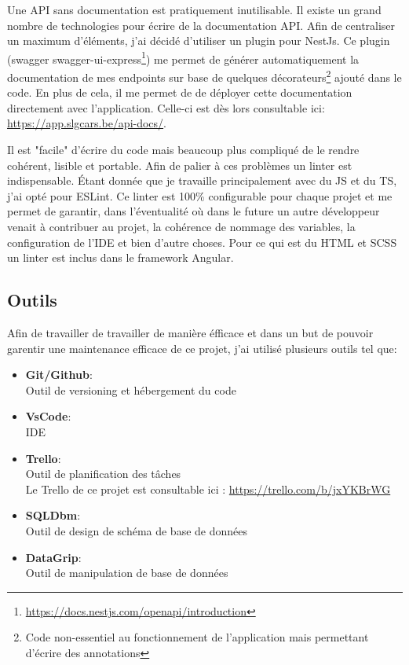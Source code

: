\newpara

Une API sans documentation est pratiquement inutilisable. Il existe un grand nombre de technologies pour écrire de la documentation API. Afin de centraliser un maximum d'éléments, j'ai décidé d'utiliser un plugin pour NestJs. Ce plugin (swagger swagger-ui-express\footnote{\url{https://docs.nestjs.com/openapi/introduction}}) me permet de générer automatiquement la documentation de mes endpoints sur base de quelques décorateurs\footnote{Code non-essentiel au fonctionnement de l'application mais permettant d'écrire des annotations} ajouté dans le code. En plus de cela, il me permet de de déployer cette documentation directement avec l'application. Celle-ci est dès lors consultable ici:\\\url{https://app.slgcars.be/api-docs/}.

\newpage


Il est "facile" d'écrire du code mais beaucoup plus compliqué de le rendre cohérent, lisible et portable. Afin de palier à ces problèmes un linter est indispensable. Étant donnée que je travaille principalement avec du JS et du TS, j'ai opté pour ESLint. Ce linter est 100\% configurable pour chaque projet et me permet de garantir, dans l'éventualité où dans le future un autre développeur venait à contribuer au projet, la cohérence de nommage des variables, la configuration de l'IDE et bien d'autre choses. Pour ce qui est du HTML et SCSS un linter est inclus dans le framework Angular.

\subsection{Outils}

Afin de travailler de travailler de manière éfficace et dans un but de pouvoir garentir une maintenance efficace de ce projet, j'ai utilisé plusieurs outils tel que:

\newpara

\begin{itemize}
  \item \textbf{Git/Github}: \\ Outil de versioning et hébergement du code 
  \item \textbf{VsCode}: \\ IDE 
  \item \textbf{Trello}: \\ Outil de planification des tâches \\ Le Trello de ce projet est consultable ici : \url{https://trello.com/b/jxYKBrWG}
  \item \textbf{SQLDbm}: \\ Outil de design de schéma de base de données
  \item \textbf{DataGrip}: \\ Outil de manipulation de base de données
\end{itemize}
